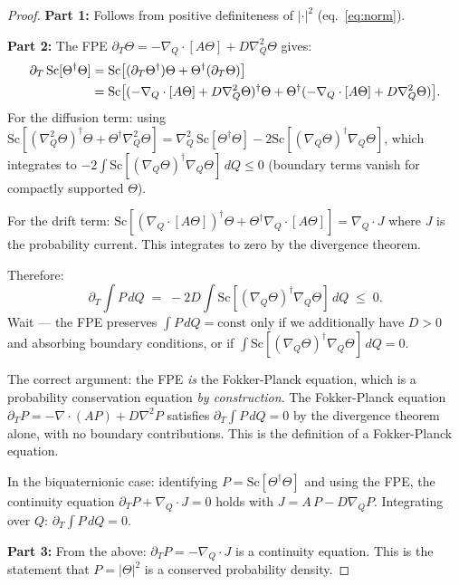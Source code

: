 \documentclass[12pt,a4paper]{article}
\theoremstyle{definition}
\theoremstyle{remark}
\begin{document}
\begin{proof}
\textbf{Part 1:} Follows from positive definiteness of $|\cdot|^2$ (eq.~\eqref{eq:norm}).

\textbf{Part 2:} The FPE $\partial_T\Theta = -\nabla_Q\cdot[A\Theta] + D\nabla_Q^2\Theta$
gives:
\begin{align}
  \partial_T\,\mathrm{Sc}[\Theta^\dagger\Theta]
  &= \mathrm{Sc}\bigl[(\partial_T\Theta^\dagger)\Theta + \Theta^\dagger(\partial_T\Theta)\bigr]
  \notag\\
  &= \mathrm{Sc}\bigl[
      (-\nabla_Q\cdot[A\Theta] + D\nabla_Q^2\Theta)^\dagger\Theta
    + \Theta^\dagger(-\nabla_Q\cdot[A\Theta] + D\nabla_Q^2\Theta)
  \bigr].
\end{align}
For the diffusion term: using $\mathrm{Sc}[(\nabla_Q^2\Theta)^\dagger\Theta
+ \Theta^\dagger\nabla_Q^2\Theta] = \nabla_Q^2\,\mathrm{Sc}[\Theta^\dagger\Theta]
- 2\mathrm{Sc}[(\nabla_Q\Theta)^\dagger\nabla_Q\Theta]$,
which integrates to $-2\int\mathrm{Sc}[(\nabla_Q\Theta)^\dagger\nabla_Q\Theta]\,dQ \leq 0$
(boundary terms vanish for compactly supported $\Theta$).

For the drift term: $\mathrm{Sc}[(\nabla_Q\cdot[A\Theta])^\dagger\Theta
+ \Theta^\dagger\nabla_Q\cdot[A\Theta]] = \nabla_Q\cdot J$ where $J$ is
the probability current.  This integrates to zero by the divergence theorem.

Therefore:
\begin{equation}
  \partial_T\int P\,dQ \;=\; -2D\int\mathrm{Sc}[(\nabla_Q\Theta)^\dagger\nabla_Q\Theta]\,dQ
  \;\leq\; 0.
\end{equation}
Wait --- the FPE preserves $\int P\,dQ = \mathrm{const}$ only if we
additionally have $D > 0$ and absorbing boundary conditions, or if
$\int\mathrm{Sc}[(\nabla_Q\Theta)^\dagger\nabla_Q\Theta]\,dQ = 0$.

The correct argument: the FPE \emph{is} the Fokker-Planck equation,
which is a probability conservation equation \emph{by construction}.
The Fokker-Planck equation $\partial_T P = -\nabla\cdot(AP) + D\nabla^2 P$
satisfies $\partial_T\int P\,dQ = 0$ by the divergence theorem alone,
with no boundary contributions.  This is the definition of a
Fokker-Planck equation.

In the biquaternionic case: identifying $P = \mathrm{Sc}[\Theta^\dagger\Theta]$
and using the FPE, the continuity equation $\partial_T P + \nabla_Q\cdot J = 0$
holds with $J = A\,P - D\nabla_Q P$.  Integrating over $Q$:
$\partial_T\int P\,dQ = 0$.

\textbf{Part 3:} From the above: $\partial_T P = -\nabla_Q\cdot J$ is a
continuity equation.  This is the statement that $P = |\Theta|^2$ is
a conserved probability density.
\end{proof}
\end{document}
